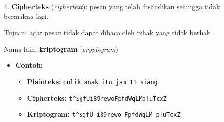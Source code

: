 \documentclass{article}
\begin{document}

4. \textbf{Cipherteks} (\textit{ciphertext}): pesan yang telah disandikan sehingga tidak bermakna lagi.

Tujuan: agar pesan tidak dapat dibaca oleh pihak yang tidak berhak.

Nama lain: \textbf{kriptogram} (\textit{cryptogram})

\begin{itemize}
    \item \textbf{Contoh:}
    \begin{itemize}
        \item \textbf{Plainteks:} \texttt{culik anak itu jam 11 siang}
        \item \textbf{Cipherteks:} \texttt{t\textasciicircum\$gfUi89rewoFpfdWqLMp[uTcxZ}
        \item \textbf{Kriptogram:} \texttt{t\textasciicircum\$gfU i89rewo FpfdWqLM p[uTcxZ}
    \end{itemize}
\end{itemize}
\end{document}
